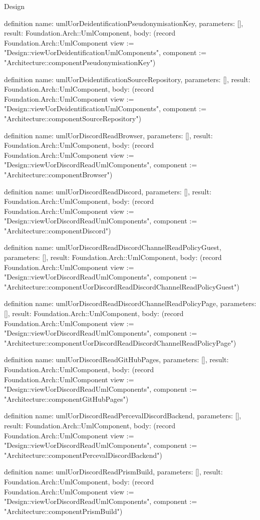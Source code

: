 \begin{lexlean}{Design}
\begin{semanticmodule}
definition{
  name: umlUorDeidentificationPseudonymisationKey,
  parameters: [],
  result: Foundation.Arch::UmlComponent,
  body: (record Foundation.Arch::UmlComponent {view := "Design::viewUorDeidentificationUmlComponents", component := "Architecture::componentPseudonymisationKey"})
}

definition{
  name: umlUorDeidentificationSourceRepository,
  parameters: [],
  result: Foundation.Arch::UmlComponent,
  body: (record Foundation.Arch::UmlComponent {view := "Design::viewUorDeidentificationUmlComponents", component := "Architecture::componentSourceRepository"})
}

definition{
  name: umlUorDiscordReadBrowser,
  parameters: [],
  result: Foundation.Arch::UmlComponent,
  body: (record Foundation.Arch::UmlComponent {view := "Design::viewUorDiscordReadUmlComponents", component := "Architecture::componentBrowser"})
}

definition{
  name: umlUorDiscordReadDiscord,
  parameters: [],
  result: Foundation.Arch::UmlComponent,
  body: (record Foundation.Arch::UmlComponent {view := "Design::viewUorDiscordReadUmlComponents", component := "Architecture::componentDiscord"})
}

definition{
  name: umlUorDiscordReadDiscordChannelReadPolicyGuest,
  parameters: [],
  result: Foundation.Arch::UmlComponent,
  body: (record Foundation.Arch::UmlComponent {view := "Design::viewUorDiscordReadUmlComponents", component := "Architecture::componentUorDiscordReadDiscordChannelReadPolicyGuest"})
}

definition{
  name: umlUorDiscordReadDiscordChannelReadPolicyPage,
  parameters: [],
  result: Foundation.Arch::UmlComponent,
  body: (record Foundation.Arch::UmlComponent {view := "Design::viewUorDiscordReadUmlComponents", component := "Architecture::componentUorDiscordReadDiscordChannelReadPolicyPage"})
}

definition{
  name: umlUorDiscordReadGitHubPages,
  parameters: [],
  result: Foundation.Arch::UmlComponent,
  body: (record Foundation.Arch::UmlComponent {view := "Design::viewUorDiscordReadUmlComponents", component := "Architecture::componentGitHubPages"})
}

definition{
  name: umlUorDiscordReadPercevalDiscordBackend,
  parameters: [],
  result: Foundation.Arch::UmlComponent,
  body: (record Foundation.Arch::UmlComponent {view := "Design::viewUorDiscordReadUmlComponents", component := "Architecture::componentPercevalDiscordBackend"})
}

definition{
  name: umlUorDiscordReadPrismBuild,
  parameters: [],
  result: Foundation.Arch::UmlComponent,
  body: (record Foundation.Arch::UmlComponent {view := "Design::viewUorDiscordReadUmlComponents", component := "Architecture::componentPrismBuild"})
}


\end{semanticmodule}
\end{lexlean}
